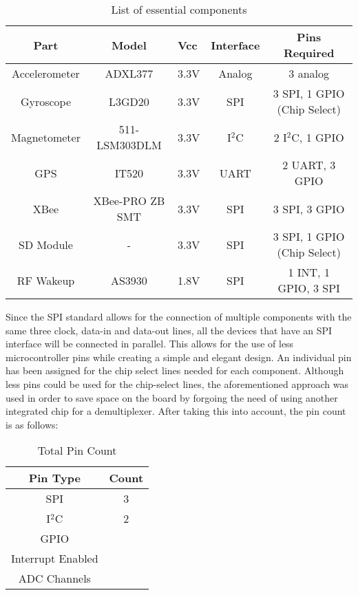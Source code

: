 \begin{table}[H]
\setlength{\extrarowheight}{1.5pt}
  \centering
  \caption{List of essential components}
    \begin{tabular}{|c|c|m{0.35in}|c|c|}
    \hline
    Part  & Model & \centering Vcc & Interface & Pins Required \\
    \hline \hline
    Accelerometer & ADXL377 & \centering 3.3V  & Analog & 3 analog \\ \hline
    Gyroscope & L3GD20 & \centering 3.3V  & SPI   & 3 SPI, 1 GPIO (Chip Select) \\ \hline
    Magnetometer & 511-LSM303DLM & \centering 3.3V  & I$^2$C   & 2 I$^2$C, 1 GPIO \\ \hline
    GPS   & IT520 & \centering 3.3V   & UART  & 2 UART, 3 GPIO \\ \hline 
    XBee  & XBee-PRO ZB SMT &\centering 3.3V  & SPI   & 3 SPI, 3 GPIO \\ \hline
    SD Module &   -    & \centering 3.3V  & SPI   & 3 SPI, 1 GPIO (Chip Select) \\ \hline
    RF Wakeup & AS3930 & \centering 1.8V  & SPI   & 1 INT, 1 GPIO, 3 SPI \\ \hline
    
    \end{tabular}%
  \label{tab:componentPinCount}%
\end{table}%

Since the SPI standard allows for the connection of multiple components with the same three clock, data-in and data-out lines, all the devices that have an SPI interface will be connected in parallel.  This allows for the use of less microcontroller pins while creating a simple and elegant design.  An individual pin has been assigned for the chip select lines needed for each component.  Although less pins could be used for the chip-select lines, the aforementioned approach was used in order to save space on the board by forgoing the need of using another integrated chip for a demultiplexer.  After taking this into account, the pin count is as follows:

\begin{table}[H]
\setlength{\extrarowheight}{1.5pt}
  \centering
  \caption{Total Pin Count}
    \begin{tabular}{|c|c|}
    \hline
    Pin Type  & Count \\
    \hline \hline
   	SPI & 3 \\ \hline
   	I$^2$C & 2 \\ \hline
   	GPIO & \\ \hline
   	Interrupt Enabled & \\ \hline
   	ADC Channels & \\ \hline
    \end{tabular}%
  \label{tab:pinCountTotal}%
\end{table}%

